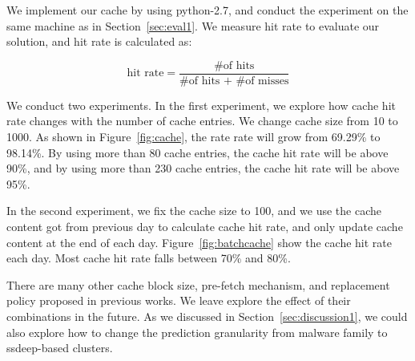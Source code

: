 We implement our cache by using python-2.7, 
and conduct the experiment on the same machine as in Section~\ref{sec:eval1}. 
We measure hit rate to evaluate our solution, and hit rate is calculated as: 

$$ \mbox{hit rate} = \dfrac{\mbox{\# of hits}}{\mbox{\# of hits + \# of misses}}$$

We conduct two experiments. In the first experiment, 
we explore how cache hit rate changes with the number of cache entries. 
We change cache size from 10 to 1000. As shown in Figure~\ref{fig:cache}, 
the rate rate will grow from 69.29\% to 98.14\%. 
By using more than 80 cache entries, the cache hit rate will be above 90\%, 
and by using more than 230 cache entries, the cache hit rate will be above 95\%. 

In the second experiment, we fix the cache size to 100, 
and we use the cache content got from previous day to calculate cache hit rate, 
and only update cache content at the end of each day. Figure~\ref{fig:batchcache} show the cache hit rate each day. 
Most cache hit rate falls between 70\% and 80\%.  

There are many other cache block size, pre-fetch mechanism, and replacement policy proposed in previous works. 
We leave explore the effect of their combinations in the future. 
As we discussed in Section~\ref{sec:discussion1}, 
we could also explore how to change the prediction granularity from malware family to ssdeep-based clusters. 
